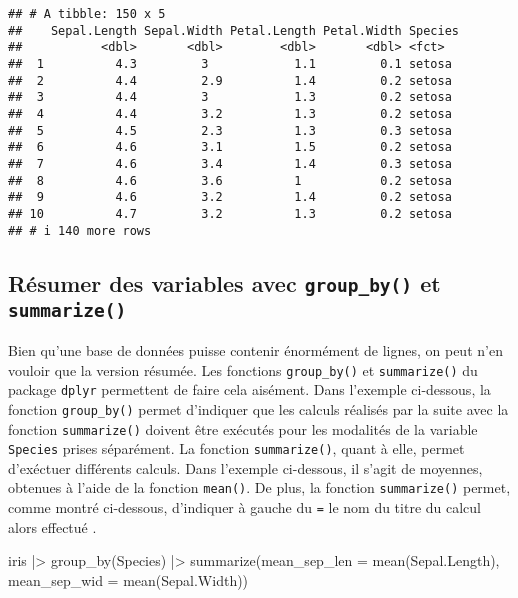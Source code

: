 \documentclass[
]{book}
\newenvironment{Shaded}{\begin{snugshade}}{\end{snugshade}}
\newcommand{\AttributeTok}[1]{\textcolor[rgb]{0.77,0.63,0.00}{#1}}
\newcommand{\FunctionTok}[1]{\textcolor[rgb]{0.00,0.00,0.00}{#1}}
\newcommand{\NormalTok}[1]{#1}
\newcommand{\SpecialCharTok}[1]{\textcolor[rgb]{0.00,0.00,0.00}{#1}}
\begin{document}
\begin{verbatim}
## # A tibble: 150 x 5
##    Sepal.Length Sepal.Width Petal.Length Petal.Width Species
##           <dbl>       <dbl>        <dbl>       <dbl> <fct>  
##  1          4.3         3            1.1         0.1 setosa 
##  2          4.4         2.9          1.4         0.2 setosa 
##  3          4.4         3            1.3         0.2 setosa 
##  4          4.4         3.2          1.3         0.2 setosa 
##  5          4.5         2.3          1.3         0.3 setosa 
##  6          4.6         3.1          1.5         0.2 setosa 
##  7          4.6         3.4          1.4         0.3 setosa 
##  8          4.6         3.6          1           0.2 setosa 
##  9          4.6         3.2          1.4         0.2 setosa 
## 10          4.7         3.2          1.3         0.2 setosa 
## # i 140 more rows
\end{verbatim}

\hypertarget{ruxe9sumer-des-variables-avec-group_by-et-summarize}{%
\subsection{\texorpdfstring{Résumer des variables avec \texttt{group\_by()} et \texttt{summarize()}}{Résumer des variables avec group\_by() et summarize()}}\label{ruxe9sumer-des-variables-avec-group_by-et-summarize}}

Bien qu'une base de données puisse contenir énormément de lignes, on peut n'en vouloir que la version résumée. Les fonctions \texttt{group\_by()} et \texttt{summarize()} du package \texttt{dplyr} permettent de faire cela aisément. Dans l'exemple ci-dessous, la fonction \texttt{group\_by()} permet d'indiquer que les calculs réalisés par la suite avec la fonction \texttt{summarize()} doivent être exécutés pour les modalités de la variable \texttt{Species} prises séparément. La fonction \texttt{summarize()}, quant à elle, permet d'exéctuer différents calculs. Dans l'exemple ci-dessous, il s'agit de moyennes, obtenues à l'aide de la fonction \texttt{mean()}. De plus, la fonction \texttt{summarize()} permet, comme montré ci-dessous, d'indiquer à gauche du \texttt{=} le nom du titre du calcul alors effectué .

\begin{Shaded}
\begin{Highlighting}[]
\NormalTok{iris }\SpecialCharTok{|\textgreater{}} 
  \FunctionTok{group\_by}\NormalTok{(Species) }\SpecialCharTok{|\textgreater{}} 
  \FunctionTok{summarize}\NormalTok{(}\AttributeTok{mean\_sep\_len =} \FunctionTok{mean}\NormalTok{(Sepal.Length),}
            \AttributeTok{mean\_sep\_wid =} \FunctionTok{mean}\NormalTok{(Sepal.Width))}
\end{Highlighting}
\end{Shaded}
\end{document}

